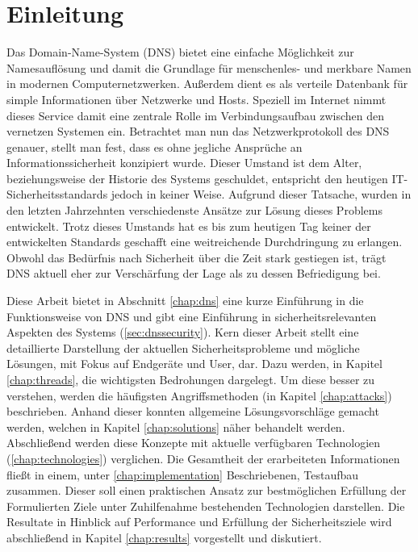 \chapter{Einleitung}
Das Domain-Name-System (DNS) bietet eine einfache Möglichkeit zur Namesauflösung und damit die Grundlage für menschenles- und merkbare Namen in modernen Computernetzwerken. Außerdem dient es als verteile Datenbank für simple Informationen über Netzwerke und Hosts. Speziell im Internet nimmt dieses Service damit eine zentrale Rolle im Verbindungsaufbau zwischen den vernetzen Systemen ein. Betrachtet man nun das Netzwerkprotokoll des DNS genauer, stellt man fest, dass es ohne jegliche Ansprüche an Informationssicherheit konzipiert wurde. Dieser Umstand ist dem Alter, beziehungsweise der Historie des Systems geschuldet, entspricht den heutigen IT-Sicherheitsstandards jedoch in keiner Weise. Aufgrund dieser Tatsache, wurden in den letzten Jahrzehnten verschiedenste Ansätze zur Lösung dieses Problems entwickelt. Trotz dieses Umstands hat es bis zum heutigen Tag keiner der entwickelten Standards geschafft eine weitreichende Durchdringung zu erlangen. Obwohl das Bedürfnis nach Sicherheit über die Zeit stark gestiegen ist, trägt DNS aktuell eher zur Verschärfung der Lage als zu dessen Befriedigung bei.

Diese Arbeit bietet in Abschnitt \ref{chap:dns} eine kurze Einführung in die Funktionsweise von DNS und gibt eine Einführung in sicherheitsrelevanten Aspekten des Systems (\ref{sec:dnssecurity}). Kern dieser Arbeit stellt eine detaillierte Darstellung der aktuellen Sicherheitsprobleme und mögliche Lösungen, mit Fokus auf Endgeräte und User, dar. Dazu werden, in Kapitel \ref{chap:threads}, die wichtigsten Bedrohungen dargelegt. Um diese besser zu verstehen, werden die häufigsten Angriffsmethoden (in Kapitel \ref{chap:attacks}) beschrieben. Anhand dieser konnten allgemeine Lösungsvorschläge gemacht werden, welchen in Kapitel \ref{chap:solutions} näher behandelt werden. Abschließend werden diese Konzepte mit aktuelle verfügbaren Technologien (\ref{chap:technologies}) verglichen. Die Gesamtheit der erarbeiteten Informationen fließt in einem, unter \ref{chap:implementation} Beschriebenen, Testaufbau zusammen. Dieser soll einen praktischen Ansatz zur bestmöglichen Erfüllung der Formulierten Ziele unter Zuhilfenahme bestehenden Technologien darstellen. Die Resultate in Hinblick auf Performance und Erfüllung der Sicherheitsziele wird abschließend in Kapitel \ref{chap:results} vorgestellt und diskutiert.
